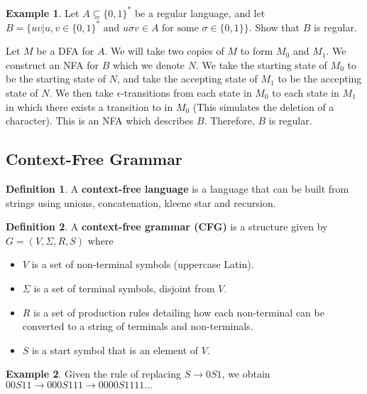 \documentclass[11pt]{article}
\theoremstyle{plain} %
\theoremstyle{definition}
\newtheorem*{definition}{Definition} %
\theoremstyle{example}
\newtheorem*{example}{Example}
\theoremstyle{remark}
\begin{document}
\begin{example}
Let $A \subseteq \{0,1\}^*$ be a regular language, and let $B= \{uv | u,v \in \{0,1\}^* \text{ and } u \sigma v \in A \text{ for some } \sigma \in \{0,1\}\}$. Show that $B$ is regular.
\end{example}

Let $M$ be a DFA for $A$. We will take two copies of $M$ to form $M_0$ and $M_1$. We construct an NFA for $B$ which we denote $N$. We take the starting state of $M_0$ to be the starting state of $N$, and take the accepting state of $M_1$ to be the accepting state of $N$. We then take $\epsilon$-transitions from each state in $M_0$ to each state in $M_1$ in which there exists a transition to in $M_0$ (This simulates the deletion of a character). This is an NFA which describes $B$. Therefore, $B$ is regular.





\subsection{Context-Free Grammar}


\begin{definition}
A \textbf{context-free language} is a language that can be built from strings using unions, concatenation, kleene star and recursion.
\end{definition}

\begin{definition}
A \textbf{context-free grammar (CFG)} is a structure given by $G = (V, \Sigma, R, S)$ where

	\begin{itemize}
		\item $V$ is a set of non-terminal symbols (uppercase Latin).
		\item $\Sigma$ is a set of terminal symbols, disjoint from $V$.
		\item $R$ is a set of production rules detailing how each non-terminal can be converted to a string of terminals and non-terminals.
		\item $S$ is a start symbol that is an element of $V$.
	\end{itemize}
\end{definition}

\begin{example}
Given the rule of replacing $S \rightarrow 0S1$, we obtain $00S11 \rightarrow 000S111 \rightarrow 0000S1111...$
\end{example}
\end{document}
